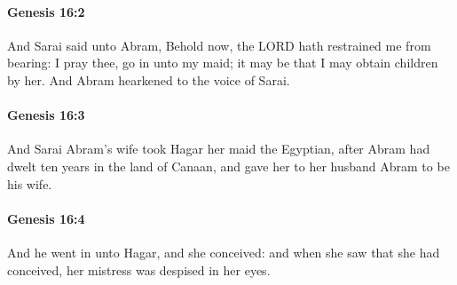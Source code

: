 		\paragraph{Genesis 16:2} %
			\label{GENESIS-16-2}

			And Sarai said unto Abram, Behold now, the LORD hath restrained me from bearing: I pray thee, go in unto my maid; it may be that I may obtain children by her.  And Abram hearkened to the voice of Sarai.


		\paragraph{Genesis 16:3} %
			\label{GENESIS-16-3}

			And Sarai Abram's wife took Hagar her maid the Egyptian, after Abram had dwelt ten years in the land of Canaan, and gave her to her husband Abram to be his wife.


		\paragraph{Genesis 16:4} %
			\label{GENESIS-16-4}

			And he went in unto Hagar, and she conceived: and when she saw that she had conceived, her mistress was despised in her eyes.


